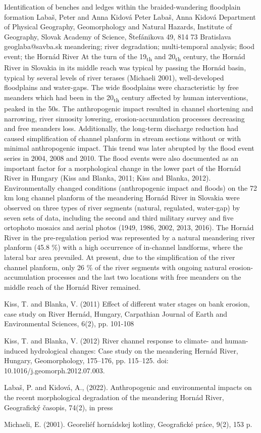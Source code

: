 \abstract
{Identification of benches and ledges within the braided-wandering floodplain formation} %
{Labaš, Peter and Anna Kidová} %
{Peter Labaš, Anna Kidová} %
{\KLtag} %
{Department of Physical Geography, Geomorphology and Natural Hazards, Institute of Geography, Slovak Academy of Science, Štefánikova 49, 814 73 Bratislava} %
{geoglaba@savba.sk}  %
{meandering; river degradation; multi-temporal analysis; flood event; the Hornád River}%
{At the turn of the 19\textsubscript{th} and 20\textsubscript{th} century, the Hornád River in Slovakia in its middle reach was typical by passing the Hornád basin, typical by several levels of river terases (Michaeli 2001), well-developed floodplains and water-gaps. The wide floodplains were characteristic by free meanders which had been in the 20\textsubscript{th} century affected by human interventions, peaked in the 50s. The anthropogenic impact resulted in channel shortening and narrowing, river sinuosity lowering, erosion-accumulation processes decreasing and free meanders loss. Additionally, the long-term discharge reduction had caused simplification of channel planform in stream sections without or with minimal anthropogenic impact. This trend was later abrupted by the flood event series in 2004, 2008 and 2010. The flood events were also documented as an important factor for a morphological change in the lower part of the Hornád River in Hungary (Kiss and Blanka, 2011; Kiss and Blanka, 2012). Environmentally changed conditions (anthropogenic impact and floods) on the 72 km long channel planform of the meandering Hornád River in Slovakia were observed on three types of river segments (natural, regulated, water-gap) by seven sets of data, including the second and third military survey and five ortophoto mosaics and aerial photos (1949, 1986, 2002, 2013, 2016). The Hornád River in the pre-regulation period was represented by a natural meandering river planform (45.8 \%) with a high occurrence of in-channel landforms, where the lateral bar area prevailed. At present, due to the simplification of the river channel planform, only 26 \% of the river segments with ongoing natural erosion-accumulation processes and the last two locations with free meanders on the middle reach of the Hornád River remained.
}%
{Kiss, T. and Blanka, V. (2011) Effect of different water stages on bank erosion, case study on River Hernád, Hungary, Carpathian Journal of Earth and Environmental Sciences, 6(2), pp. 101-108
	
	Kiss, T. and Blanka, V. (2012) River channel response to climate- and human-induced hydrological changes: Case study on the meandering Hernád River, Hungary, Geomorphology, 175–176, pp. 115–125. doi: 10.1016/j.geomorph.2012.07.003.
	
	Labaš, P. and Kidová, A., (2022). Anthropogenic and environmental impacts on the recent morphological degradation of the meandering Hornád River, Geografický časopis,  74(2), in press
	
	Michaeli, E. (2001). Georeliéf hornádskej kotliny, Geografické práce, 9(2), 153 p.  
}%

